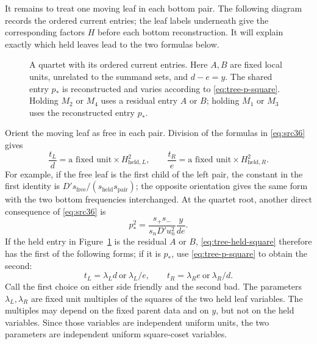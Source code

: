 It remains to treat one moving leaf in each bottom pair.  The following
diagram records the ordered current entries; the leaf labels underneath
give the corresponding factors $H$ before each bottom reconstruction.
It will explain exactly which held leaves lead to the two formulas below.
\begin{figure}[htbp]
 \centering
 \caption{A quartet with its ordered current entries.  Here $A,B$ are
 fixed local units, unrelated to the summand sets, and $d-e=y$.
 The shared entry $p_*$ is reconstructed and varies according to
 \eqref{eq:tree-p-square}.  Holding $M_2$
 or $M_4$ uses a residual entry $A$ or $B$; holding $M_1$ or $M_3$
 uses the reconstructed entry $p_*$.}
 \label{fig:tree-quartet}
\end{figure}

Orient the moving leaf as free in each pair.  Division of the formulas
in \eqref{eq:src36} gives
\begin{equation}\label{eq:tree-held-square}
 \frac{t_L}{d}=\text{a fixed unit}\times H_{\mathrm{held},L}^2,
 \qquad
 \frac{t_R}{e}=\text{a fixed unit}\times H_{\mathrm{held},R}^2.
\end{equation}
For example, if the free leaf is the first child of the left pair,
the constant in the first identity is
$D's_{\mathrm{free}}/(s_{\mathrm{held}}s_{\mathrm{pair}})$;
the opposite orientation gives the same form with the two bottom
frequencies interchanged.  At the quartet root, another direct
consequence of \eqref{eq:src36} is
\begin{equation}\label{eq:tree-p-square}
 p_*^2=\frac{s_+s_-}{s_nD'u_n^2}\frac{y}{de}.
\end{equation}
If the held entry in Figure~\ref{fig:tree-quartet} is the residual
$A$ or $B$, \eqref{eq:tree-held-square} therefore has the first of
the following forms; if it is $p_*$, use
\eqref{eq:tree-p-square} to obtain the second:
\begin{equation}\label{eq:tree-friendly-bad}
 t_L=\lambda_Ld\ \text{or}\ \lambda_L/e,
 \qquad
 t_R=\lambda_Re\ \text{or}\ \lambda_R/d.
\end{equation}
Call the first choice on either side friendly and the second bad.
The parameters $\lambda_L,\lambda_R$ are fixed unit multiples of the
squares of the two held leaf variables.  The multiples may depend on
the fixed parent data and on $y$, but not on the held variables.  Since
those variables are independent uniform units, the two parameters
are independent uniform square-coset variables.


